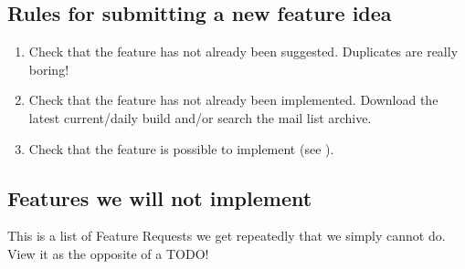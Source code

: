 \subsection{Rules for submitting a new feature idea}

\begin{enumerate}
\item Check that the feature has not already been suggested. 
  Duplicates are really boring!
\item Check that the feature has not already been implemented. 
  Download the latest current/daily build and/or search the mail list archive.
\item Check that the feature is possible to implement (see ).
\end{enumerate}

\subsection{\label{ref:NODO}Features we will not implement}
This is a list of Feature Requests we get repeatedly that we simply
cannot do. View it as the opposite of a TODO!

